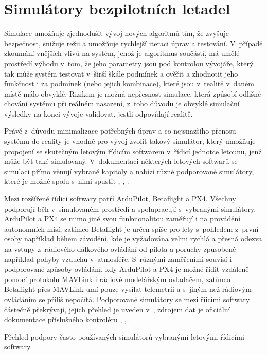 \chapter{Simulátory bezpilotních letadel} \label{chap:sims}
    Simulace umožňuje zjednodušit vývoj nových algoritmů tím, že zvyšuje bezpečnost, snižuje režii a umožňuje rychlejší iteraci úprav a testování. V~případě zkoumání vnějších vlivů na systém, jehož je algoritmus součástí, má umělé prostředí výhodu v~tom, že jeho parametry jsou pod kontrolou vývojáře, který tak může systém testovat v~širší škále podmínek a ověřit a zhodnotit jeho funkčnost i za podmínek (nebo jejich kombinace), které jsou v~realitě v~daném místě málo obvyklé. Rizikem je možná nepřesnost simulace, která způsobí odlišné chování systému při reálném nasazení, z~toho důvodu je obvyklé simulační výsledky na konci vývoje validovat, jestli odpovídají realitě.

    Právě z~důvodu minimalizace potřebných úprav a co nejsnazšího přenosu systému do reality je vhodné pro vývoj zvolit takový simulátor, který umožňuje propojení se skutečným letovým řídicím softwarem v~řídicí jednotce letounu, jenž může být také simulovaný. V~dokumentaci některých letových softwarů se simulaci přímo věnují vybrané kapitoly a nabízí různé podporované simulátory, které je možné spolu s~nimi spustit \cite{px4:simulation}, \cite{ardupilot:simulation}, \cite{betaflight:simulation}.

    Mezi rozšířené řídicí softwary patří ArduPilot, Betaflight a PX4. Všechny podporují běh v~simulovaném prostředí a spolupracují s~vybranými simulátory. ArduPilot a PX4 se mimo jiné svou funkcionalitou zaměřují i na provádění autonomních misí, zatímco Betaflight je určen spíše pro lety s~pohledem z~první osoby například během závodění, kde je vyžadována velmi rychlá a přesná odezva na vstupy z~rádiového dálkového ovládání od pilota a poruchy způsobené například pohyby vzduchu v~atmosféře. S~různými zaměřeními souvisí i podporované způsoby ovládání, kdy ArduPilot a PX4 je možné řídit vzdáleně pomocí protokolu MAVLink i rádiově modelářským ovladačem, zatímco Betaflight přes MAVLink umí pouze vysílat telemetrii a s~jiným než rádiovým ovládáním se příliš nepočítá. Podporované simulátory se mezi říicími softwary částečně překrývají, jejich přehled je uveden v~, zdrojem dat je oficiální dokumentace příslušného kontroléru \cite{px4:simulation}, \cite{ardupilot:simulation}, \cite{betaflight:simulation}.

    \begin{table}
        \centering
        
        \caption[Simulátory podporované kontrolérem letounu]{Přehled podpory často používaných simulátorů vybranými letovými řídicími softwary.}
        \label{tab:sims}
    \end{table}

